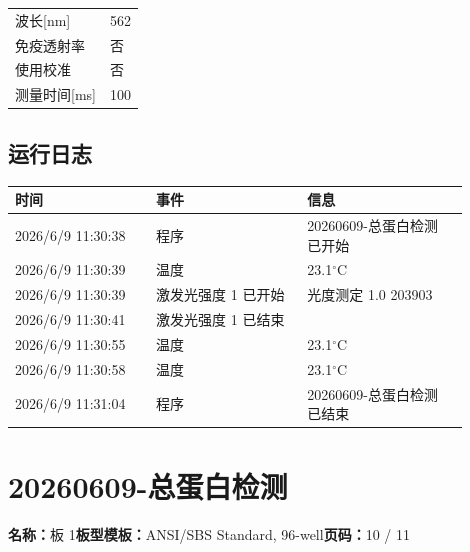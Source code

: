 \documentclass[UTF8,10pt,a4paper,fontset=fandol]{ctexart}
\begin{document}
\begin{tabular}{@{}ll@{}}
波长[nm] & 562 \\
免疫透射率 & 否 \\
使用校准 & 否 \\
测量时间[ms] & 100 \\
\end{tabular}

\subsection*{运行日志}

\begin{tabular}{@{}p{0.28\linewidth}p{0.30\linewidth}p{0.32\linewidth}@{}}
时间 & 事件 & 信息 \\
\hline
2026/6/9 11:30:38 & 程序 & 20260609-总蛋白检测 已开始 \\
2026/6/9 11:30:39 & 温度 & 23.1$^\circ$C \\
2026/6/9 11:30:39 & 激发光强度 1 已开始 & 光度测定 1.0 203903 \\
2026/6/9 11:30:41 & 激发光强度 1 已结束 & \\
2026/6/9 11:30:55 & 温度 & 23.1$^\circ$C \\
2026/6/9 11:30:58 & 温度 & 23.1$^\circ$C \\
2026/6/9 11:31:04 & 程序 & 20260609-总蛋白检测 已结束 \\
\end{tabular}

\newpage

\section*{20260609-总蛋白检测}

\noindent\textbf{名称：}板 1\hfill\textbf{板型模板：}ANSI/SBS Standard, 96-well\hfill\textbf{页码：}10 / 11
\end{document}
